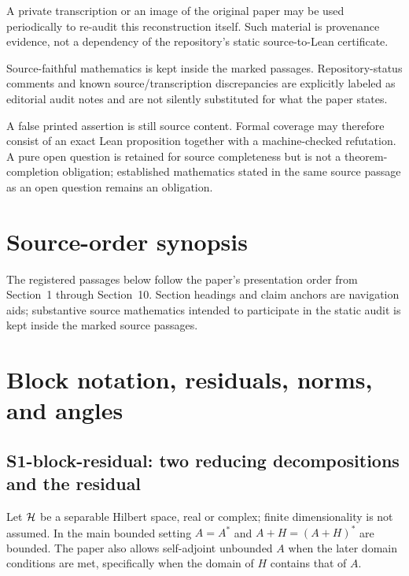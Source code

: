 \begin{sourceguide}
\item[External provenance] A private transcription or an image of the original paper may be used periodically to re-audit this reconstruction itself.  Such material is provenance evidence, not a dependency of the repository's static source-to-Lean certificate.
\item[Editorial separation] Source-faithful mathematics is kept inside the marked passages.  Repository-status comments and known source/transcription discrepancies are explicitly labeled as editorial audit notes and are not silently substituted for what the paper states.
\item[Completion semantics] A false printed assertion is still source content.  Formal coverage may therefore consist of an exact Lean proposition together with a machine-checked refutation.  A pure open question is retained for source completeness but is not a theorem-completion obligation; established mathematics stated in the same source passage as an open question remains an obligation.
\end{sourceguide}

\section*{Source-order synopsis}
The registered passages below follow the paper's presentation order from Section~1 through Section~10.  Section headings and claim anchors are navigation aids; substantive source mathematics intended to participate in the static audit is kept inside the marked source passages.

\section{Block notation, residuals, norms, and angles}

\subsection*{S1-block-residual: two reducing decompositions and the residual}
Let $\mathcal{H}$ be a separable Hilbert space, real or complex; finite dimensionality is not assumed.  In the main bounded setting $A=A^*$ and $A+H=(A+H)^*$ are bounded.  The paper also allows self-adjoint unbounded $A$ when the later domain conditions are met, specifically when the domain of $H$ contains that of $A$.

